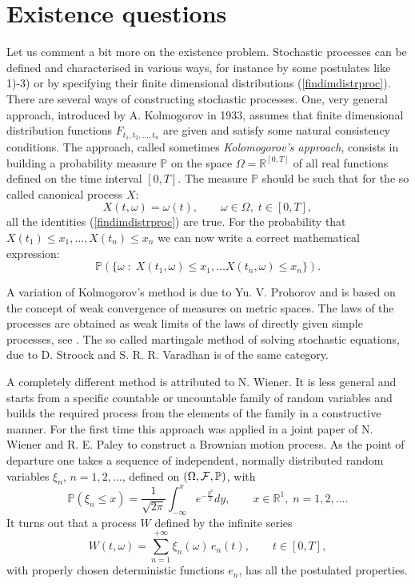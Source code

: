 \documentclass[preprint]{imsart}
\def\P{\mathbb P}
\def\R{\mathbb R}
\begin{document}
{\section{Existence questions}

\noindent Let us comment a bit more on the existence problem. Stochastic processes can be defined and characterised
in various
ways, for instance by some postulates like 1)-3) or
by specifying  their finite dimensional distributions
(\ref{findimdistrproc}).
There are several  ways of constructing stochastic processes.
One, very general approach, introduced by A. Kolmogorov \cite{bib5} in 1933,
assumes that finite dimensional distribution functions
$F_{t_1,t_2,\ldots,t_n}$ are given and satisfy some natural
consistency conditions. The approach, called sometimes {\it Kolomogorov's approach},   consists in building a
probability measure $\P$ on the space $\Omega= \R^{[0,T]}$ of all
real functions defined on the time interval $[0,T]$. The measure
$\P$ should be such that for the so called canonical process $X$:
$$
X(t,\omega)=\omega (t), \qquad \omega\in\Omega,\; t\in [0,T],
$$
all the identities (\ref{findimdistrproc})
are true. For the probability that $ X(t_1)\leq x_1,
\ldots, X(t_n)\leq x_n$ we can  now write a correct mathematical
expression:
$$
\P(\{\omega\; :\; X(t_1,\omega)\leq x_1, \ldots
X(t_n,\omega)\leq x_n\}).
$$
\vspace{3mm}

\noindent A variation of Kolmogorov's method is due to Yu. V. Prohorov \cite{prohorov} and is based on the concept of
weak convergence of
measures on metric spaces. The laws of the processes are obtained as weak limits of the laws of directly given simple
processes, see \cite{billingsley1}. The so called martingale method of solving stochastic equations, due to D. Stroock
and S. R. R. Varadhan \cite{stroock} is of the same category.
\vspace{3mm}

\noindent A completely different method is attributed to N. Wiener. It is less general and starts from a specific countable
or uncountable family of  random
variables and builds the required process from the elements of the family in a
constructive manner. For the first time this approach was applied in a joint paper of N. Wiener
and R. E. Paley \cite{bib9}
to  construct a Brownian motion
process. As  the point of
departure one takes  a sequence of independent, normally distributed random
variables $\xi_n$, $n=1,2,\ldots$, defined on $(\Omega,
{\cal F}, \P)$, with
$$
\P(\xi_n\leq x)= \frac{1}{\sqrt{2\pi}} \int_{-\infty}^x
e^{-\frac{y^2}{2}}dy,\qquad x\in\R^1,\;
n=1,2,\ldots.
$$
It turns out that  a process $W$ defined by the infinite series
$$
W(t, \omega)=\sum_{n=1}^{+\infty} \xi_n(\omega)\, e_n(t),\qquad t\in [0,T],
$$
with properly chosen deterministic functions $e_n$, has all the
postulated properties.
\vspace{3mm}

}
\end{document}
